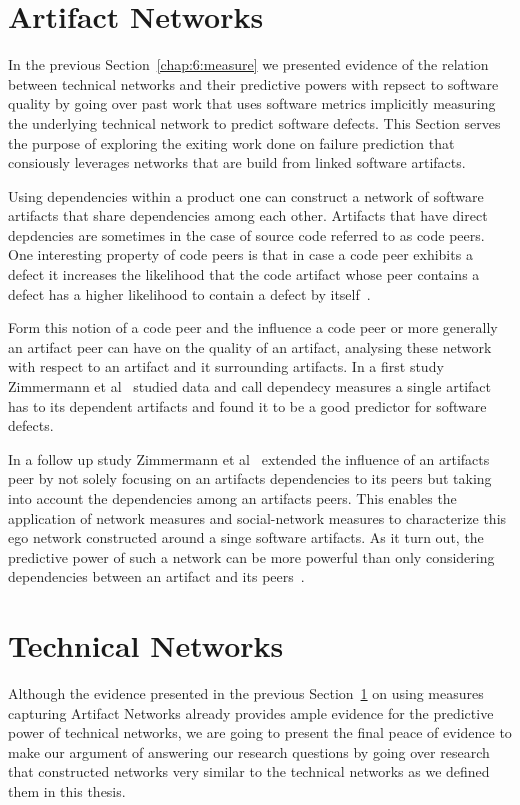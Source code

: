 \section{Artifact Networks}
\label{chap:6:an}
In the previous Section~\ref{chap:6:measure} we presented evidence of the relation between technical networks and their predictive powers with repsect to software quality by going over past work that uses software metrics implicitly measuring the underlying technical network to predict software defects.
This Section serves the purpose of exploring the exiting work done on failure prediction that consiously leverages networks that are build from linked software artifacts.

Using dependencies within a product one can construct a network of software artifacts that share dependencies among each other.
Artifacts that have direct depdencies are sometimes in the case of source code referred to as code peers.
One interesting property of code peers is that in case a code peer exhibits a defect it increases the likelihood that the code artifact whose peer contains a defect has a higher likelihood to contain a defect by itself~\cite{nguyen:icse:2010}.

Form this notion of a code peer and the influence a code peer or more generally an artifact peer can have on the quality of an artifact, analysing these network with respect to an artifact and it surrounding artifacts.
In a first study Zimmermann et al~\cite{zimmermann:icse:2008} studied data and call dependecy measures a single artifact has to its dependent artifacts and found it to be a good predictor for software defects.

In a follow up study Zimmermann et al~\cite{zimmermann:esem:2009} extended the influence of an artifacts peer by not solely focusing on an artifacts dependencies to its peers but taking into account the dependencies among an artifacts peers.
This enables the application of network measures and social-network measures to characterize this ego network constructed around a singe software artifacts.
As it turn out, the predictive power of such a network can be more powerful than only considering dependencies between an artifact and its peers~\cite{zimmermann:esem:2009}.

\section{Technical Networks}
\label{chap:6:tn}
Although the evidence presented in the previous Section~\ref{chap:6:an} on using measures capturing Artifact Networks already provides ample evidence for the predictive power of technical networks, we are going to present the final peace of evidence to make our argument of answering our research questions by going over research that constructed networks very similar to the technical networks as we defined them in this thesis.

